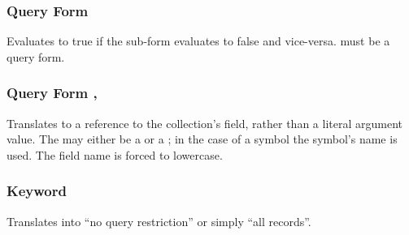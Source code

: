 \subsubsection{Query Form }
Evaluates to true if the sub-form evaluates to false and vice-versa.
 must be a query form.
\subsubsection{Query Form , }
Translates to a reference to the collection's field, rather than a literal argument value. The  may either be a  or a ; in the case of a symbol the symbol's name is used. The field name is forced to lowercase.
\subsubsection{Keyword }
Translates into ``no query restriction'' or simply ``all records''.
